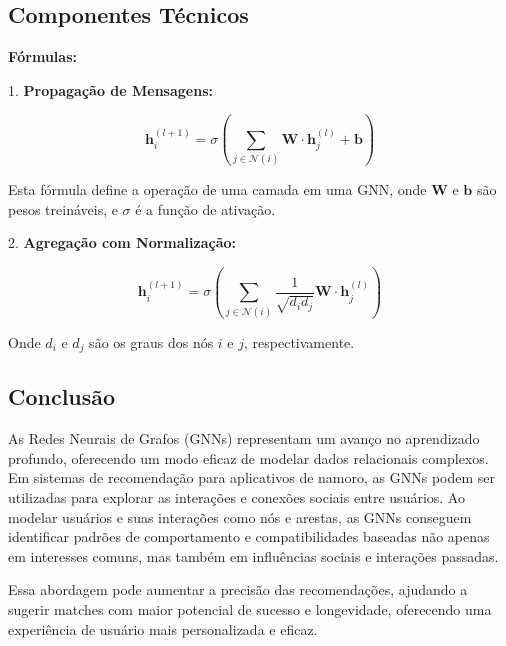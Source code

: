 \subsection{Componentes Técnicos}

\textbf{Fórmulas:}

1. \textbf{Propagação de Mensagens:}

\begin{equation}
\mathbf{h}_i^{(l+1)} = \sigma \left( \sum_{j \in \mathcal{N}(i)} \mathbf{W} \cdot \mathbf{h}_j^{(l)} + \mathbf{b} \right)
\end{equation}

Esta fórmula define a operação de uma camada em uma GNN, onde \(\mathbf{W}\) e \(\mathbf{b}\) são pesos treináveis, e \(\sigma\) é a função de ativação.

2. \textbf{Agregação com Normalização:}

\begin{equation}
\mathbf{h}_i^{(l+1)} = \sigma \left( \sum_{j \in \mathcal{N}(i)} \frac{1}{\sqrt{d_i d_j}} \mathbf{W} \cdot \mathbf{h}_j^{(l)} \right)
\end{equation}

Onde \(d_i\) e \(d_j\) são os graus dos nós \(i\) e \(j\), respectivamente.




\subsection{Conclusão}

As Redes Neurais de Grafos (GNNs) representam um avanço no aprendizado profundo, oferecendo um modo eficaz de modelar dados relacionais complexos. Em sistemas de recomendação para aplicativos de namoro, as GNNs podem ser utilizadas para explorar as interações e conexões sociais entre usuários. Ao modelar usuários e suas interações como nós e arestas, as GNNs conseguem identificar padrões de comportamento e compatibilidades baseadas não apenas em interesses comuns, mas também em influências sociais e interações passadas.

Essa abordagem pode aumentar a precisão das recomendações, ajudando a sugerir matches com maior potencial de sucesso e longevidade, oferecendo uma experiência de usuário mais personalizada e eficaz.
